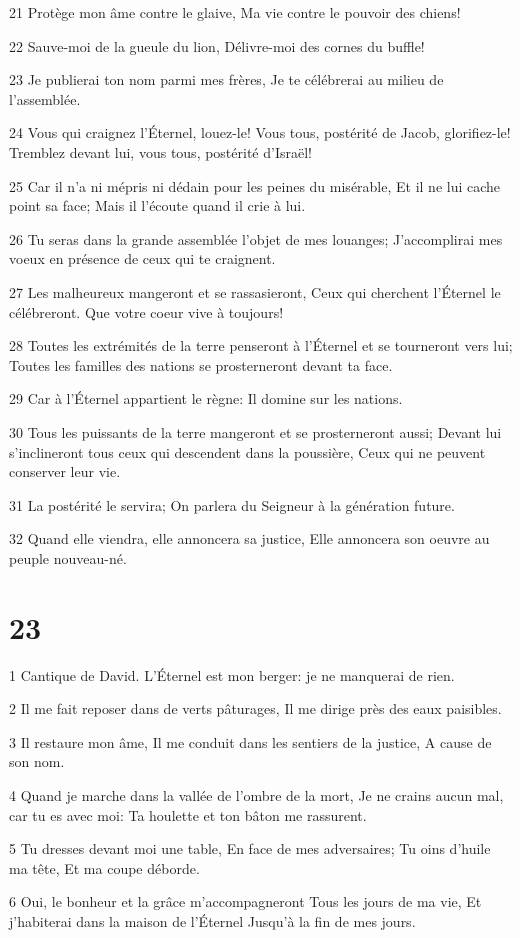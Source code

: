 \par 21 Protège mon âme contre le glaive, Ma vie contre le pouvoir des chiens!
\par 22 Sauve-moi de la gueule du lion, Délivre-moi des cornes du buffle!
\par 23 Je publierai ton nom parmi mes frères, Je te célébrerai au milieu de l'assemblée.
\par 24 Vous qui craignez l'Éternel, louez-le! Vous tous, postérité de Jacob, glorifiez-le! Tremblez devant lui, vous tous, postérité d'Israël!
\par 25 Car il n'a ni mépris ni dédain pour les peines du misérable, Et il ne lui cache point sa face; Mais il l'écoute quand il crie à lui.
\par 26 Tu seras dans la grande assemblée l'objet de mes louanges; J'accomplirai mes voeux en présence de ceux qui te craignent.
\par 27 Les malheureux mangeront et se rassasieront, Ceux qui cherchent l'Éternel le célébreront. Que votre coeur vive à toujours!
\par 28 Toutes les extrémités de la terre penseront à l'Éternel et se tourneront vers lui; Toutes les familles des nations se prosterneront devant ta face.
\par 29 Car à l'Éternel appartient le règne: Il domine sur les nations.
\par 30 Tous les puissants de la terre mangeront et se prosterneront aussi; Devant lui s'inclineront tous ceux qui descendent dans la poussière, Ceux qui ne peuvent conserver leur vie.
\par 31 La postérité le servira; On parlera du Seigneur à la génération future.
\par 32 Quand elle viendra, elle annoncera sa justice, Elle annoncera son oeuvre au peuple nouveau-né.

\chapter{23}

\par 1 Cantique de David. L'Éternel est mon berger: je ne manquerai de rien.
\par 2 Il me fait reposer dans de verts pâturages, Il me dirige près des eaux paisibles.
\par 3 Il restaure mon âme, Il me conduit dans les sentiers de la justice, A cause de son nom.
\par 4 Quand je marche dans la vallée de l'ombre de la mort, Je ne crains aucun mal, car tu es avec moi: Ta houlette et ton bâton me rassurent.
\par 5 Tu dresses devant moi une table, En face de mes adversaires; Tu oins d'huile ma tête, Et ma coupe déborde.
\par 6 Oui, le bonheur et la grâce m'accompagneront Tous les jours de ma vie, Et j'habiterai dans la maison de l'Éternel Jusqu'à la fin de mes jours.

